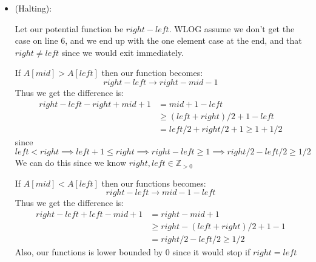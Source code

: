 \documentclass[12pt, letterpaper]{article}
\theoremstyle{definition}
\newcommand{\Z}{\mathbb{Z}}
\begin{document}
\begin{enumerate}[(a)]
\begin{itemize}
        Case 2: If $A[mid] > A[mid]$, the left half of the array is sorted. Specifically:
        \[
        A[mid] < A[mid + 1] < A[mid + 2] < \dots < A[mid]
        \]
        Since the left half is sorted, the transition point (where the maximum wraps to the minimum) cannot lie in the left half. Thus, we update the search to the right half by setting $mid \gets mid + 1$. We know assume Case 2 did not happen.

        Case 3: If $A[mid] \leq A[mid]$, the right half of the array is sorted. Specifically:
        \[
        A[mid] < A[mid + 1] < A[mid + 2] < \dots < A[right] < A[mid]
        \]
        Since the right half is sorted, the transition point must lie in the left half. Thus, we update the search to the left half by setting $right \gets mid$.

        Finally, if the while loop terminates without returning (i.e., when $left = right$), the range contains only one element, which must be the maximum. This is because each iteration eliminates half of the array, ensuring the maximum remains in the reduced range. When one element remains, it is guaranteed to be the maximum.

        \item (Halting):
        
        Let our potential function be $right - left$. WLOG assume we don't get the case on line 6, and we end up with the one element case at the end, and that $right \neq left$ since we would exit immediately.

        If $A[mid] > A[left]$ then our function becomes: 
        \[right -left \to right - mid - 1\] 
        Thus we get the difference is:
        \begin{align*}
            right - left - right + mid + 1&=mid + 1 - left\\
            &\geq (left+right)/2 + 1 - left\\
            &= left/2 + right/2 + 1 \geq 1 + 1/2
        \end{align*}
        since 
        \[left < right \implies left+1 \leq right \implies right -left \geq 1 \implies right/2 -left/2 \geq 1/2\] We can do this since we know $right,left \in \Z_{>0}$

        If $A[mid] < A[left]$ then our functions becomes: 
        \[right - left \to mid - 1 - left\]
        Thus we get the difference is:
        \begin{align*}
            right - left + left - mid + 1 &= right - mid + 1\\
            &\geq right - (left + right)/2 + 1 - 1\\
            &= right/2 - left/2 \geq 1/2
        \end{align*}
        Also, our functions is lower bounded by $0$ since it would stop if $right = left$


\end{itemize}
\end{enumerate}
\end{document}
